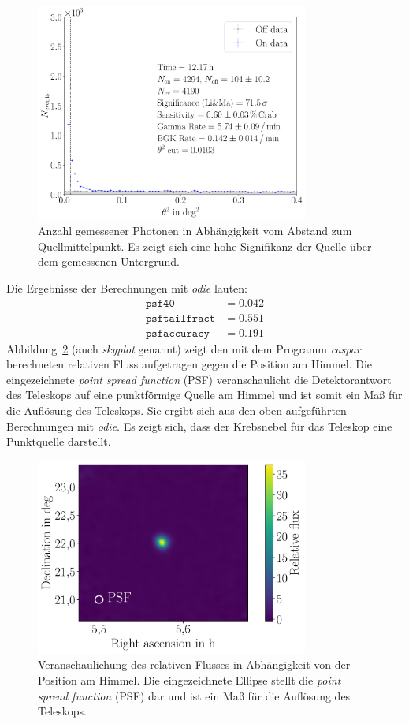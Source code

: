 \begin{figure}[H]
  \centering
  \includegraphics[width=0.8\textwidth]{figures/odie_thetasquared.pdf}
  \caption{Anzahl gemessener Photonen in Abhängigkeit vom Abstand zum
  Quellmittelpunkt. Es zeigt sich eine hohe Signifikanz der Quelle über dem
  gemessenen Untergrund.}
  \label{fig:detectionplot}
\end{figure}

Die Ergebnisse der Berechnungen mit \textit{odie} lauten:
%
\begin{align*}
    \texttt{psf40} &= 0.042 \\
    \texttt{psftailfract} &= 0.551 \\
    \texttt{psfaccuracy} &= 0.191
\end{align*}
%
Abbildung~\ref{fig:skyplot} (auch \textit{skyplot} genannt) zeigt den mit dem
Programm \textit{caspar} berechneten relativen Fluss aufgetragen gegen die
Position am Himmel. Die eingezeichnete \textit{point spread function} (PSF)
veranschaulicht die Detektorantwort des Teleskops auf eine punktförmige Quelle
am Himmel und ist somit ein Maß für die Auflösung des Teleskops. Sie ergibt
sich aus den oben aufgeführten Berechnungen mit \textit{odie}. Es zeigt sich,
dass der Krebsnebel für das Teleskop eine Punktquelle darstellt.

\begin{figure}[H]
  \centering
  \includegraphics[width=0.8\textwidth]{figures/caspar_flux_skymap.pdf}
  \caption{Veranschaulichung des relativen Flusses in Abhängigkeit von der
  Position am Himmel. Die eingezeichnete Ellipse stellt die
  \textit{point spread function} (PSF) dar und ist ein Maß für die Auflösung des
  Teleskops.}
  \label{fig:skyplot}
\end{figure}

